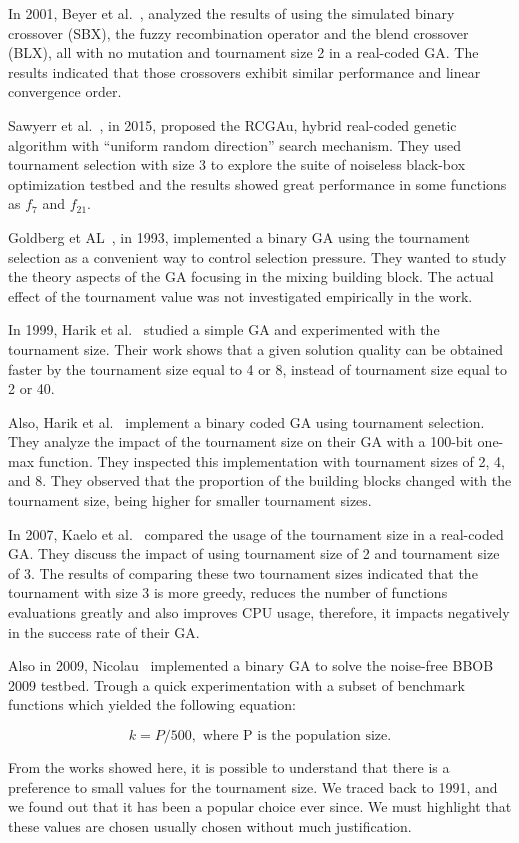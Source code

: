In 2001, Beyer et al.~\cite{beyer2001self}, analyzed the results of using the simulated binary crossover (SBX), the fuzzy recombination operator and the blend crossover (BLX), all with no mutation and tournament size 2 in a real-coded GA. The results indicated that those crossovers exhibit similar performance and linear convergence order.


Sawyerr et al.~\cite{sawyerr2015benchmarking}, in 2015, proposed the RCGAu, hybrid real-coded genetic algorithm with ``uniform random direction'' search mechanism. They used tournament selection with size 3 to explore the suite of noiseless black-box optimization testbed and the results showed great performance in some functions as $f_7$ and $f_{21}$.

Goldberg et AL~\cite{goldberg1993toward}, in 1993, implemented a binary GA using the tournament selection as a convenient way to control selection pressure. They wanted to study the theory aspects of the GA focusing in the mixing building block. The actual effect of the tournament value was not investigated empirically in the work.

In 1999, Harik et al.~\cite{harik1999compact} studied a simple GA and experimented with the tournament size. Their work shows that a given solution quality can be obtained faster by the tournament size equal to 4 or 8, instead of tournament size equal to 2 or 40. 

Also, Harik et al.~\cite{harik1999gambler} implement a binary coded GA using tournament selection. They analyze the impact of the tournament size on their GA with a 100-bit one-max function. They inspected this implementation with tournament sizes of 2, 4, and 8. They observed that the proportion of the building blocks changed with the tournament size, being higher for smaller tournament sizes.

In 2007, Kaelo et al.~\cite{kaelo2007integrated} compared the usage of the tournament size in a real-coded GA. They discuss the impact of using tournament size of 2 and tournament size of 3. The results of comparing these two tournament sizes indicated that the tournament with size 3 is more greedy, reduces the number of functions evaluations greatly and also improves CPU usage, therefore, it impacts negatively in the success rate of their GA.


Also in 2009, Nicolau~\cite{nicolau2009application} implemented a binary GA to solve the noise-free BBOB 2009 testbed. Trough a quick experimentation with a subset of benchmark functions which yielded the following equation:

\vspace{-7.5mm}
\begin{equation}
k = P/500, \text{ where P is the population size.}
\end{equation}


From the works showed here, it is possible to understand that there is a preference to small values for the tournament size. We traced back to 1991, and we found out that it has been a popular choice ever since. We must highlight that these values are chosen usually chosen without much justification.




